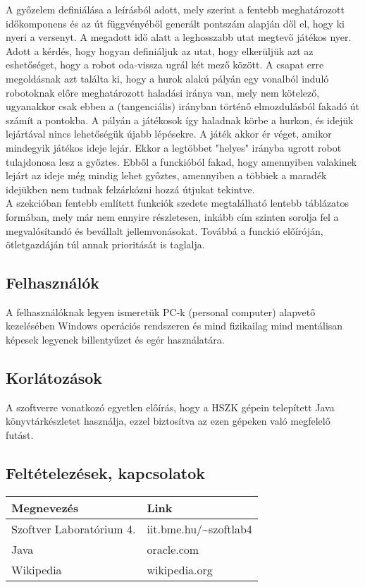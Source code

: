 {A győzelem definiálása a leírásból adott, mely szerint a fentebb meghatározott időkomponens és az út függvényéből generált pontszám alapján dől el, hogy ki nyeri a versenyt. A megadott idő alatt a leghosszabb utat megtevő játékos nyer. Adott a kérdés, hogy hogyan definiáljuk az utat, hogy elkerüljük azt az eshetőséget, hogy a robot oda-vissza ugrál két mező között. A csapat erre megoldásnak azt találta ki, hogy a hurok alakú pályán egy vonalból induló robotoknak előre meghatározott haladási iránya van, mely nem kötelező, ugyanakkor csak ebben a (tangenciális) irányban történő elmozdulásból fakadó út számít a pontokba. A pályán a játékosok így haladnak körbe a hurkon, és idejük lejártával nincs lehetőségük újabb lépésekre. A játék akkor ér véget, amikor mindegyik játékos ideje lejár. Ekkor a legtöbbet "helyes" irányba ugrott robot tulajdonosa lesz a győztes. Ebből a funckióból fakad, hogy amennyiben valakinek lejárt az ideje még mindig lehet győztes, amennyiben a többiek a maradék idejükben nem tudnak felzárkózni hozzá útjukat tekintve. 
\\
A szekcióban fentebb említett funkciók szedete megtalálható lentebb táblázatos formában, mely már nem ennyire részletesen, inkább cím szinten sorolja fel a megvalósítandó és bevállalt jellemvonásokat. Továbbá a funckió előíróján, ötletgazdáján túl annak prioritását is taglalja. 
}

\subsection{Felhasználók}
A felhasználóknak legyen ismeretük PC-k (personal computer) alapvető kezelésében Windows operációs rendszeren és mind fizikailag mind mentálisan képesek legyenek billentyűzet és egér használatára.


\subsection{Korlátozások}
A szoftverre vonatkozó egyetlen előírás, hogy a HSZK gépein telepített Java könyvtárkészletet használja, ezzel biztosítva az ezen gépeken való megfelelő futást.

\subsection{Feltételezések, kapcsolatok}

\begin{tabularx}{\textwidth}{| l | l |}
\hline
\textbf{Megnevezés} & \textbf{Link} \tabularnewline 
\hline\hline
\endhead
Szoftver Laboratórium 4. & iit.bme.hu/\textasciitilde szoftlab4 \tabularnewline \hline
Java & oracle.com \tabularnewline \hline
Wikipedia & wikipedia.org \tabularnewline \hline
\end{tabularx}

